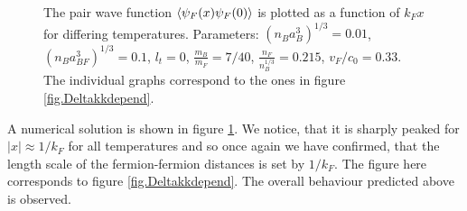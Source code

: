 \begin{figure} 
\begin{center}  
  
\caption{The pair wave function $\braket{\psi_F(x)\psi_F(0)}$ is plotted as a function of $k_Fx$ for differing temperatures. Parameters: $(n_Ba_B^3)^{1/3} = 0.01$, $(n_Ba_{BF}^3)^{1/3} = 0.1$, $l_t = 0$, $\frac{m_B}{m_F} = 7/40$, $\frac{n_F}{n_B^{1/3}} = 0.215$, $v_F/c_0 = 0.33$. The individual graphs correspond to the ones in figure \ref{fig.Deltakkdepend}. }  
\label{fig.pairwavefunction}  
\end{center}    
\end{figure}

A numerical solution is shown in figure \ref{fig.pairwavefunction}. We notice, that it is sharply peaked for $|x| \approx 1/k_F$ for all temperatures and so once again we have confirmed, that the length scale of the fermion-fermion distances is set by $1/k_F$. The figure here corresponds to figure \ref{fig.Deltakkdepend}. The overall behaviour predicted above is observed.

